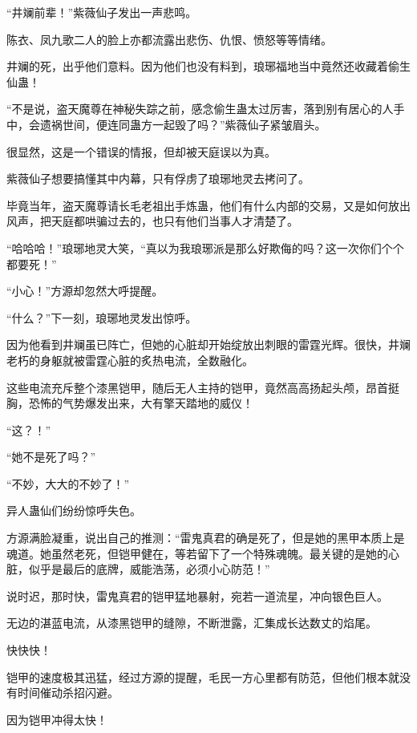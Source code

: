 
\begin{this_body}



“井斓前辈！”紫薇仙子发出一声悲鸣。

陈衣、凤九歌二人的脸上亦都流露出悲伤、仇恨、愤怒等等情绪。

井斓的死，出乎他们意料。因为他们也没有料到，琅琊福地当中竟然还收藏着偷生仙蛊！

“不是说，盗天魔尊在神秘失踪之前，感念偷生蛊太过厉害，落到别有居心的人手中，会遗祸世间，便连同蛊方一起毁了吗？”紫薇仙子紧皱眉头。

很显然，这是一个错误的情报，但却被天庭误以为真。

紫薇仙子想要搞懂其中内幕，只有俘虏了琅琊地灵去拷问了。

毕竟当年，盗天魔尊请长毛老祖出手炼蛊，他们有什么内部的交易，又是如何放出风声，把天庭都哄骗过去的，也只有他们当事人才清楚了。

“哈哈哈！”琅琊地灵大笑，“真以为我琅琊派是那么好欺侮的吗？这一次你们个个都要死！”

“小心！”方源却忽然大呼提醒。

“什么？”下一刻，琅琊地灵发出惊呼。

因为他看到井斓虽已阵亡，但她的心脏却开始绽放出刺眼的雷霆光辉。很快，井斓老朽的身躯就被雷霆心脏的炙热电流，全数融化。

这些电流充斥整个漆黑铠甲，随后无人主持的铠甲，竟然高高扬起头颅，昂首挺胸，恐怖的气势爆发出来，大有擎天踏地的威仪！

“这？！”

“她不是死了吗？”

“不妙，大大的不妙了！”

异人蛊仙们纷纷惊呼失色。

方源满脸凝重，说出自己的推测：“雷鬼真君的确是死了，但是她的黑甲本质上是魂道。她虽然老死，但铠甲健在，等若留下了一个特殊魂魄。最关键的是她的心脏，似乎是最后的底牌，威能浩荡，必须小心防范！”

说时迟，那时快，雷鬼真君的铠甲猛地暴射，宛若一道流星，冲向银色巨人。

无边的湛蓝电流，从漆黑铠甲的缝隙，不断泄露，汇集成长达数丈的焰尾。

快快快！

铠甲的速度极其迅猛，经过方源的提醒，毛民一方心里都有防范，但他们根本就没有时间催动杀招闪避。

因为铠甲冲得太快！


\end{this_body}
